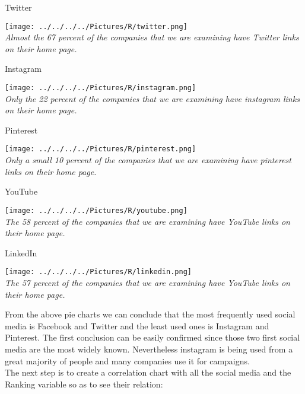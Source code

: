 \documentclass{article}
\begin{document}
\begin{table}[H]
\centering
\caption{Twitter}
\begin{center}
\texttt{[image: ../../../../Pictures/R/twitter.png]}  \\
\textit{Almost the 67 percent of the companies that we are examining have Twitter links on their home page.}
\end{center}
\end{table}

\begin{table}[H]
\centering
\caption{Instagram}
\begin{center}
\texttt{[image: ../../../../Pictures/R/instagram.png]}  \\
\textit{Only the 22 percent of the companies that we are examining have instagram links on their home page.}
\end{center}
\end{table}

\begin{table}[H]
\centering
\caption{Pinterest}
\begin{center}
\texttt{[image: ../../../../Pictures/R/pinterest.png]}  \\
\textit{Only a small 10 percent of the companies that we are examining have pinterest links on their home page.}
\end{center}
\end{table}

\begin{table}[H]
\centering
\caption{YouTube}
\begin{center}
\texttt{[image: ../../../../Pictures/R/youtube.png]}  \\
\textit{The 58 percent of the companies that we are examining have YouTube links on their home page.}
\end{center}
\end{table}

\begin{table}[H]
\centering
\caption{LinkedIn}
\begin{center}
\texttt{[image: ../../../../Pictures/R/linkedin.png]}  \\
\textit{The 57 percent of the companies that we are examining have YouTube links on their home page.}
\end{center}
\end{table}
From the above pie charts we can conclude that the most frequently used social media is Facebook and Twitter and the least used ones is Instagram and Pinterest. The first conclusion can be easily confirmed since those two first social media are the most widely known. Nevertheless instagram is being used from a great majority of people and many companies use it for campaigns.\\
The next step is to create a correlation chart with all the social media and the Ranking variable so as to see their relation:
\end{document}
